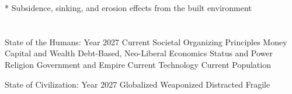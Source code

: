 \documentclass[12pt, letterpaper]{article}
\begin{document}
\begin{outline}[enumerate]
* Subsidence, sinking, and erosion effects from the built environment \\

\textit{\cite{mcgarr_2002c_ase}}\\
\textit{\cite{meijer_global_2018}}\\


\1 State of the Humans: Year 2027
\2 Current Societal Organizing Principles 
\3 Money
\4 Capital and Wealth
\4 Debt-Based, Neo-Liberal Economics
\3 Status and Power
\3 Religion
\3 Government and Empire
\2 Current Technology
\2 Current Population

\1 State of Civilization: Year 2027
\2 Globalized
\2 Weaponized
\2 Distracted
\2 Fragile
\end{outline}








\clearpage 
\renewcommand{\thepage}{}
\printbibliography
\end{document}
